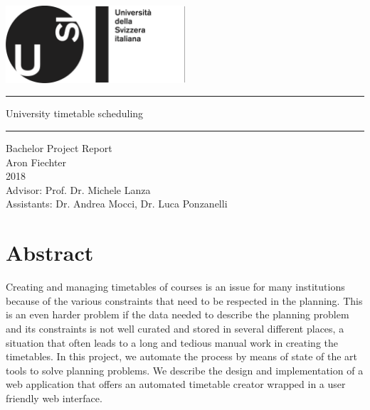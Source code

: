 \documentclass[12pt, a4paper, english]{report}
\begin{document}
\begin{titlepage}
\begin{center}
~\\[2cm]
\includegraphics[width=0.5\textwidth]{logo}\\[3.5cm]
\hrule height 1pt
\vspace{5mm}
{\Huge University timetable scheduling}
\vspace{3mm}
\hrule height 1pt
\vspace{1cm}
{\Large Bachelor Project Report}\\[3mm]
{\Large Aron Fiechter}\\[3mm]
{\Large 2018}\\[3.5cm]
{\large Advisor: Prof. Dr. Michele Lanza}\\[3mm]
{\large Assistants: Dr. Andrea Mocci, Dr. Luca Ponzanelli}
\end{center}
\end{titlepage}

\tableofcontents
\newpage

\chapter*{Abstract}
Creating and managing timetables of courses is an issue for many institutions because of the various constraints that need to be respected in the planning.
This is an even harder problem if the data needed to describe the planning problem and its constraints is not well curated and stored in several different places, a situation that often leads to a long and tedious manual work in creating the timetables.
In this project, we automate the process by means of state of the art tools to solve planning problems.
We describe the design and implementation of a web application that offers an automated timetable creator wrapped in a user friendly web interface.

\newpage

\end{document}

